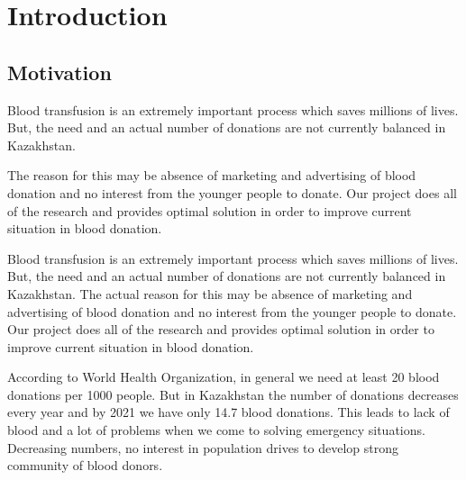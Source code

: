\begin{center}
    \setlength{\parindent}{15mm}
\end{center}
\chapter{Introduction}\label{ch:intro}
\section{Motivation}
\par
Blood transfusion is an extremely important process which saves millions of lives. But, the need and an actual number of donations are not currently balanced in Kazakhstan. 
\par
The reason for this may be absence of marketing and advertising of blood donation and no interest from the younger people to donate. Our project does all of the research and provides optimal solution in order to improve current situation in blood donation.
\par
Blood transfusion is an extremely important process which saves millions of lives. But, the need and an actual number of donations are not currently balanced in Kazakhstan. The actual reason for this may be absence of marketing and advertising of blood donation and no interest from the younger people to donate. Our project does all of the research and provides optimal solution in order to improve current situation in blood donation.
\par
According to World Health Organization, in general we need at least 20 blood donations per 1000 people. But in Kazakhstan the number of donations decreases every year and by 2021 we have only 14.7 blood donations. This leads to lack of blood and a lot of problems when we come to solving emergency situations. Decreasing numbers, no interest in population drives to develop strong community of blood donors.

